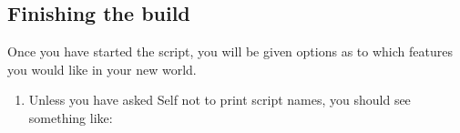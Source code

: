 \documentclass[letterpaper,10pt,english]{sphinxmanual}
\begin{document}
\subsection{Finishing the build}
\label{\detokenize{buildworld:finishing-the-build}}
Once you have started the  script, you will be given options as to which features you would like in your new world.
\begin{enumerate}
\item {} 
Unless you have asked Self not to print script names, you should see something like:

\end{enumerate}
\begin{quote}

\begin{sphinxVerbatim}[commandchars=\\\{\}]
 
 
 
 
  
\end{sphinxVerbatim}
\end{quote}
\end{document}
